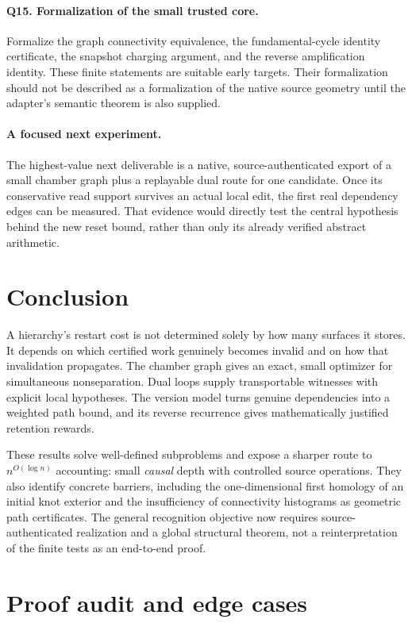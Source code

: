 \documentclass[11pt]{article}
\theoremstyle{definition}
\begin{document}
\paragraph{Q15. Formalization of the small trusted core.}
Formalize the graph connectivity equivalence, the fundamental-cycle identity certificate, the snapshot charging argument, and the reverse amplification identity. These finite statements are suitable early targets. Their formalization should not be described as a formalization of the native source geometry until the adapter's semantic theorem is also supplied.

\paragraph{A focused next experiment.}
The highest-value next deliverable is a native, source-authenticated export of a small chamber graph plus a replayable dual route for one candidate. Once its conservative read support survives an actual local edit, the first real dependency edges can be measured. That evidence would directly test the central hypothesis behind the new reset bound, rather than only its already verified abstract arithmetic.

\section{Conclusion}
A hierarchy's restart cost is not determined solely by how many surfaces it stores. It depends on which certified work genuinely becomes invalid and on how that invalidation propagates. The chamber graph gives an exact, small optimizer for simultaneous nonseparation. Dual loops supply transportable witnesses with explicit local hypotheses. The version model turns genuine dependencies into a weighted path bound, and its reverse recurrence gives mathematically justified retention rewards.

These results solve well-defined subproblems and expose a sharper route to $n^{O(\log n)}$ accounting: small \emph{causal} depth with controlled source operations. They also identify concrete barriers, including the one-dimensional first homology of an initial knot exterior and the insufficiency of connectivity histograms as geometric path certificates. The general recognition objective now requires source-authenticated realization and a global structural theorem, not a reinterpretation of the finite tests as an end-to-end proof.

\appendix
\section{Proof audit and edge cases}\label{app:audit}
\end{document}
